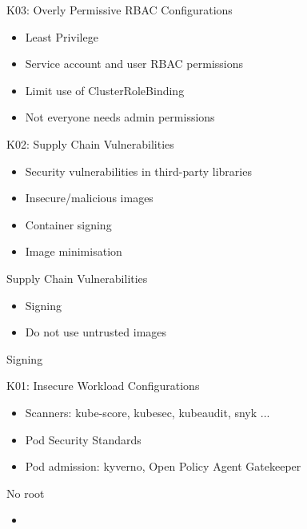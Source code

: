 \documentclass{dcpresentation}
\begin{document}

\begin{frame}{K03: Overly Permissive RBAC Configurations}
  \begin{itemize}
  \item Least Privilege
  \item Service account and user RBAC permissions
  \item Limit use of ClusterRoleBinding
  \item Not everyone needs admin permissions
  \end{itemize}
\end{frame}

\begin{frame}{K02: Supply Chain Vulnerabilities}
  \begin{itemize}
  \item Security vulnerabilities in third-party libraries
  \item Insecure/malicious images
  \item Container signing
  \item Image minimisation
  \end{itemize}
\end{frame}

\begin{frame}{Supply Chain Vulnerabilities}
  \begin{itemize}
  \item Signing
  \item Do not use untrusted images
  \end{itemize}
  Signing

\end{frame}


\begin{frame}{K01: Insecure Workload Configurations}
  \begin{itemize}
  \item Scanners: kube-score, kubesec, kubeaudit, snyk ...
  \item Pod Security Standards
  \item Pod admission: kyverno, Open Policy Agent Gatekeeper
  \end{itemize}
\end{frame}


\begin{frame}{No root}
  \begin{itemize}
    \item 
  \end{itemize}
\end{frame}
\end{document}
